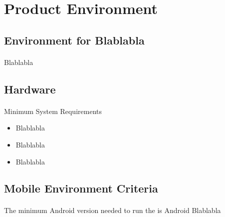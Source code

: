 \section{Product Environment}
\subsection{Environment for Blablabla}
\paragraph{}Blablabla

\subsection{Hardware}
\paragraph{}Minimum System Requirements	 
\begin{itemize}
\item Blablabla
\item Blablabla
\item Blablabla
\end{itemize}
	 
\subsection{Mobile Environment Criteria}
\paragraph{}The minimum Android version needed to run the \app is Android Blablabla
